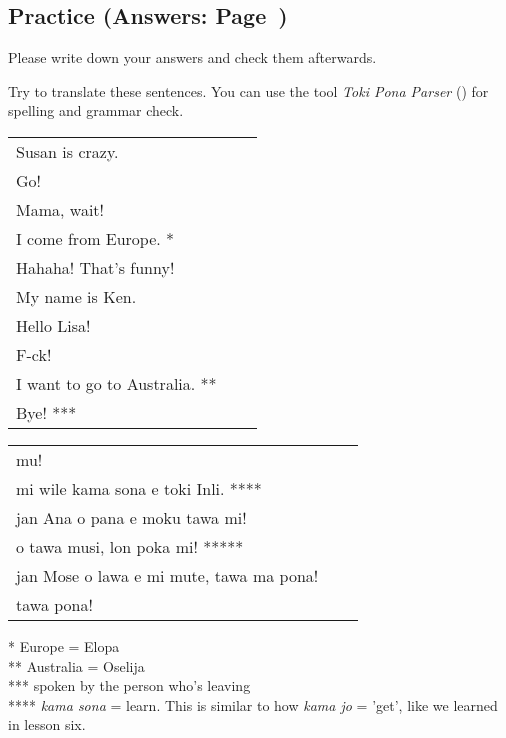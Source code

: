\subsection*{Practice (Answers: Page~\pageref{'gender_unofficial_words_etc'})}
%
Please write down your answers and check them afterwards.

Try to translate these sentences.
You can use the tool \textit{Toki Pona Parser} (\cite{www:rowa:02}) for spelling and grammar check.

\begin{supertabular}{p{5,5cm}|ll}
    Susan is crazy.               &  & \\ %
    Go!                           &  & \\ %
    Mama, wait!                   &  & \\ %
    I come from Europe. *         &  & \\ %
    Hahaha! That's funny!         &  & \\ %
    My name is Ken.               &  & \\  %
    Hello Lisa!                   &  & \\  %
    F-ck!                         &  & \\ %
    I want to go to Australia. ** &  & \\  %
    Bye! ***                      &  & \\ %
\end{supertabular}

\begin{supertabular}{p{5,5cm}|ll}
    mu!                                      &  & \\ %
    mi wile kama sona e toki Inli. ****      &  & \\ %
    jan Ana o pana e moku tawa mi!           &  & \\ %
    o tawa musi, lon poka mi! *****          &  & \\ %
    jan Mose o lawa e mi mute, tawa ma pona! &  & \\ %
    tawa pona!                               &  & \\ %
\end{supertabular}

* Europe = Elopa \\
** Australia = Oselija \\
*** spoken by the person who's leaving \\
****  \textit{kama sona} = learn. This is similar to how \textit{kama jo} = 'get', like we learned in lesson six. \\
